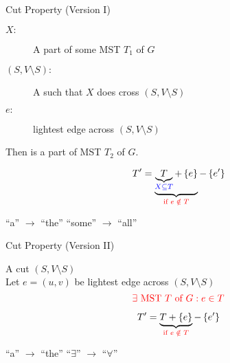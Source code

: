 
\begin{frame}{}
  \centerline{}
\end{frame}

\begin{frame}{}
  \begin{exampleblock}{Cut Property (Version I)}
    \begin{description}
      \item[$X:$] A part of some MST $T_1$ of $G$
      \item[$(S, V \setminus S):$] A  such that $X$ does  cross $(S, V \setminus S)$
    ­ \item[$e:$]  lightest edge across $(S, V \setminus S)$
    \end{description}

    \pause
    \vspace{0.30cm}
    \centerline{Then  is a part of  MST $T_2$ of $G$.}
  \end{exampleblock}

  \pause
  \vspace{0.60cm}
  \centerline{}
\end{frame}

\begin{frame}{}
  \centerline{}

  \pause
  \vspace{0.30cm}

  \pause
  \[
    T' = \underbrace{\underbrace{T}_{\textcolor{blue}{X \subseteq T}} + \left\{e\right\}}_{\textcolor{red}{\text{if } e \;\notin\; T}} - \left\{e'\right\}
  \]

  \pause
  \centerline{``a'' $\to$ ``the'' \red{$\implies$} ``some'' $\to$ ``all''}
\end{frame}

\begin{frame}{}
  \begin{exampleblock}{Cut Property (Version II)}
    \begin{center}
      A cut $(S, V \setminus S)$ \\[6pt]
      Let $e = (u,v)$ be  lightest edge across $(S, V \setminus S)$
      \[
	\textcolor{red}{\exists \text{ MST $T$ of } G: e \in T}
      \]
    \end{center}
  \end{exampleblock}


  \pause
  \vspace{-0.50cm}
  \[
    T' = \underbrace{T + \left\{e\right\}}_{\textcolor{red}{\text{if } e \;\notin\; T}} - \left\{e'\right\}
  \]
  
  \pause
  \centerline{``a'' $\to$ ``the'' \red{$\implies$} ``$\exists$'' $\to$ ``$\forall$''}
\end{frame}

